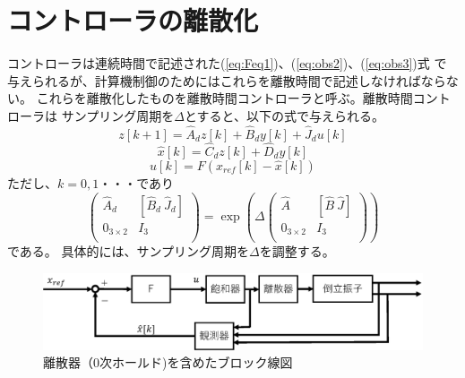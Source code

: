 \section{コントローラの離散化}
	コントローラは連続時間で記述された(\ref{eq:Feq1})、(\ref{eq:obs2})、(\ref{eq:obs3})式
	で与えられるが、計算機制御のためにはこれらを離散時間で記述しなければならない。
	これらを離散化したものを離散時間コントローラと呼ぶ。離散時間コントローラは
	サンプリング周期を$\Delta$とすると、以下の式で与えられる。
	\begin{equation}
		z[k+1] = \hat{A}_{d}z[k]+\hat{B}_{d}y[k]+\hat{J}_{d}u[k]
	\end{equation}
	\begin{equation}
		\hat{x}[k] = \hat{C}_{d}z[k] + \hat{D}_{d}y[k]
	\end{equation}
	\begin{equation}
		u[k] = F(x_{ref}[k] - \hat{x}[k])
	\end{equation}
	ただし、$k = 0,1・・・$であり
	\[
		\left(
		\begin{array}{cc}
			\hat{A}_{d} & [\hat{B}_{d}\ \hat{J}_{d}]\\
			0_{3×2} & I_{3}\\
		\end{array}
		\right)=\exp\left(\Delta\left(
		\begin{array}{cc}
			\hat{A} & [\hat{B}\ \hat{J}]\\
			0_{3×2} & I_{3}\\
		\end{array}
		\right)\right)
	\]
	である。
	具体的には、サンプリング周期を$\Delta$を調整する。
	\begin{figure}[h]
		\centering
		\includegraphics[width=0.8\linewidth]{gazo/controll_discrete.eps}
		\caption{離散器（0次ホールド)を含めたブロック線図}
		\label{image:cDISCRETE}
	\end{figure}
